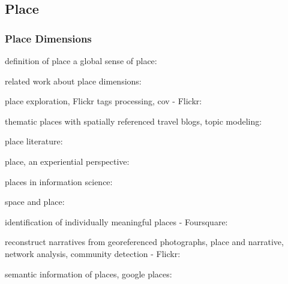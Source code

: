 \documentclass{article}
\begin{document}


\subsection{Place}
\subsubsection{Place Dimensions}
definition of place
a global sense of place: \cite{doreen_global_1991}

related work about place dimensions: \cite{bahrehdar_description_2018}

place exploration, Flickr tags processing, cov - Flickr: \cite{hollenstein_exploring_2010}

thematic places with spatially referenced travel blogs, topic modeling: \cite{sui_inferring_2013}

place literature: \cite{bahrehdar_extraction_2020}

place, an experiential perspective: \cite{tuan_place_1975}

places in information science: \cite{purves_places_2019}

space and place: \cite{agnew_space_2011}

identification of individually meaningful places - Foursquare: \cite{wang_using_2015}

reconstruct narratives from georeferenced photographs, place and narrative, network analysis, community detection - Flickr: \cite{straumann_towards_2014}

semantic information of places, google places: \cite{hallot_who_2015}
\end{document}
